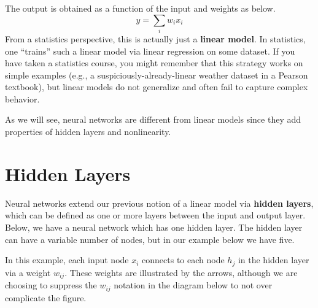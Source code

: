 \documentclass[12pt,letterpaper]{book}
\theoremstyle{definition}
\begin{document}
  The output is obtained as a function of the input and weights as below.
  \[
    y = \sum_{i} w_ix_i  
  \] 
  From a statistics perspective, this is actually just a \textbf{linear model}. In statistics, 
  one ``trains'' such a linear model via linear regression on some dataset. If you have 
  taken a statistics course, you might remember that this strategy works on simple 
  examples (e.g., a suspiciously-already-linear weather dataset in a Pearson textbook), 
  but linear models do not generalize and often fail to capture complex behavior.

  As we will see, neural networks are different from linear models since they add properties 
  of hidden layers and nonlinearity.
  
  \section{Hidden Layers}

  Neural networks extend our previous notion of a linear model via \textbf{hidden layers}, which can 
  be defined as one or more layers between the input and output layer. Below, we have 
  a neural network which has one hidden layer. The hidden layer can 
  have a variable number of nodes, but in our example below we have five.

  In this example, each input node $x_i$ connects to each node $h_j$ in the hidden layer 
  via a weight $w_{ij}$. These weights are illustrated by the arrows, although we are 
  choosing to suppress the $w_{ij}$ notation in the diagram below to not over complicate the figure.  
\end{document}
